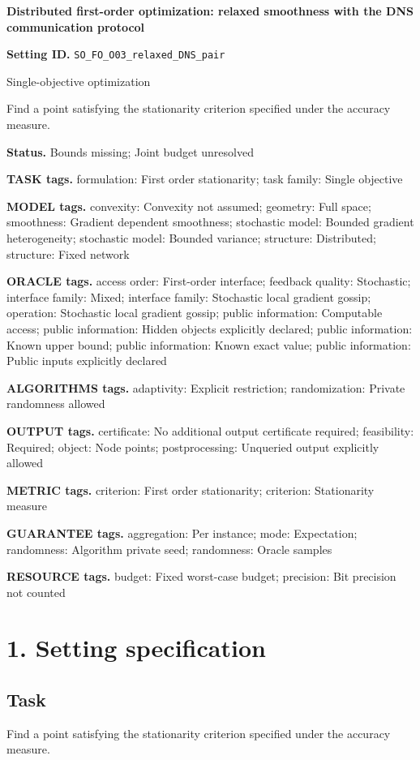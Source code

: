 \documentclass[10pt,a4paper]{article}
\begin{document}
\raggedright

{\LARGE\bfseries\sffamily\color{AtlasNavy} Distributed first-order optimization: relaxed smoothness with the DNS communication protocol\par}\vspace{5pt}
\textbf{Setting ID.} \texttt{SO\_\allowbreak{}FO\_\allowbreak{}O03\_\allowbreak{}relaxed\_\allowbreak{}DNS\_\allowbreak{}pair}

Single-objective optimization

Find a point satisfying the stationarity criterion specified under the accuracy measure.

\textbf{Status.} Bounds missing; Joint budget unresolved

\textbf{TASK tags.} formulation: First order stationarity; task family: Single objective

\textbf{MODEL tags.} convexity: Convexity not assumed; geometry: Full space; smoothness: Gradient dependent smoothness; stochastic model: Bounded gradient heterogeneity; stochastic model: Bounded variance; structure: Distributed; structure: Fixed network

\textbf{ORACLE tags.} access order: First-order interface; feedback quality: Stochastic; interface family: Mixed; interface family: Stochastic local gradient gossip; operation: Stochastic local gradient gossip; public information: Computable access; public information: Hidden objects explicitly declared; public information: Known upper bound; public information: Known exact value; public information: Public inputs explicitly declared

\textbf{ALGORITHMS tags.} adaptivity: Explicit restriction; randomization: Private randomness allowed

\textbf{OUTPUT tags.} certificate: No additional output certificate required; feasibility: Required; object: Node points; postprocessing: Unqueried output explicitly allowed

\textbf{METRIC tags.} criterion: First order stationarity; criterion: Stationarity measure

\textbf{GUARANTEE tags.} aggregation: Per instance; mode: Expectation; randomness: Algorithm private seed; randomness: Oracle samples

\textbf{RESOURCE tags.} budget: Fixed worst-case budget; precision: Bit precision not counted

\section{1. Setting specification}
\subsection{Task}
Find a point satisfying the stationarity criterion specified under the accuracy measure.
\end{document}
